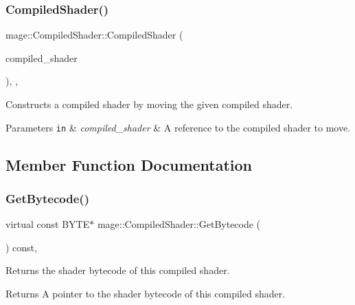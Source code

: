 \subsubsection{\texorpdfstring{Compiled\+Shader()}{CompiledShader()}\hspace{0.1cm}{\footnotesize\ttfamily [3/3]}}
{\footnotesize\ttfamily mage\+::\+Compiled\+Shader\+::\+Compiled\+Shader (\begin{DoxyParamCaption}\item[{\hyperlink{classmage_1_1_compiled_shader}{Compiled\+Shader} \&\&}]{compiled\+\_\+shader }\end{DoxyParamCaption})\hspace{0.3cm}{\ttfamily [protected]}, {\ttfamily [default]}, {\ttfamily [noexcept]}}

Constructs a compiled shader by moving the given compiled shader.


\begin{DoxyParams}[1]{Parameters}
\mbox{\tt in}  & {\em compiled\+\_\+shader} & A reference to the compiled shader to move. \\
\hline
\end{DoxyParams}


\subsection{Member Function Documentation}
\hypertarget{classmage_1_1_compiled_shader_a3d7a58d568dc30e66ea7488f28911127}{}\label{classmage_1_1_compiled_shader_a3d7a58d568dc30e66ea7488f28911127} 
\subsubsection{\texorpdfstring{Get\+Bytecode()}{GetBytecode()}}
{\footnotesize\ttfamily virtual const B\+Y\+TE$\ast$ mage\+::\+Compiled\+Shader\+::\+Get\+Bytecode (\begin{DoxyParamCaption}{ }\end{DoxyParamCaption}) const\hspace{0.3cm}{\ttfamily [pure virtual]}, {\ttfamily [noexcept]}}

Returns the shader bytecode of this compiled shader.

\begin{DoxyReturn}{Returns}
A pointer to the shader bytecode of this compiled shader. 
\end{DoxyReturn}


